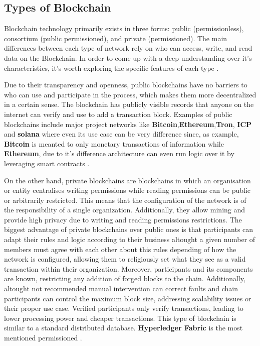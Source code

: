 \subsection{Types of Blockchain}
Blockchain technology primarily exists in three forms: public (permissionless), 
consortium (public permissioned), and private (permissioned). The main differences between each type of network 
rely on who can access, write, and read data on the Blockchain. In order to come up with a deep understanding over 
it's characteristics, it's worth exploring the specific features of each type \cite{blockchain-in-healthcare}.

Due to their transparency and openness, public blockchains have no barriers to who can use and participate 
in the process, which makes them more decentralized in a certain sense.  The blockchain has publicly visible 
records that anyone on the internet can verify and use to add a transaction block. Examples of public
blockchains include major project networks like \textbf{Bitcoin},\textbf{Ethereum},\textbf{Tron},
\textbf{ICP} and \textbf{solana} where even its use case can be very difference since, as example, 
\textbf{Bitcoin} is meanted to only monetary transactions of information while \textbf{Ethereum}, due to it's 
difference architecture can even run logic over it by leveraging smart 
contracts  \cite{introduction-blockchain} \cite{blockchain-security-issues-and-challenges} \cite{ICP} \cite{solana} \cite{tron-and-eth}.


On the other hand, private blockchains are blockchains in which an organisation 
or entity centralises writing permissions while reading permissions can be public or arbitrarily restricted. 
This means that the configuration of the network is of the responsibility of a single organization. Additionally,
they allow mining and provide high privacy due to writing and reading permissions restrictions. The 
biggest advantage of private blockchains over public ones is that participants can adapt their rules and 
logic according to their business altought a given number of members must agree with each other about this 
rules depending of how the network is configured, allowing them to religiously set what they see as a valid 
transaction within their organization. Moreover, participants and its components are known, restricting any 
addition of forged blocks to the chain. Additionally, altought not recommended manual intervention can correct 
faults and chain participants can control the maximum block size, addressing scalability issues or their proper
use case. Verified participants only verify transactions, leading to lower processing power and cheaper 
transactions. This type of blockchain is similar to a standard distributed database. \textbf{Hyperledger Fabric} 
is the most mentioned permissioned  \cite{data-processing-view-blockchain} \cite{private-blockchain}.

